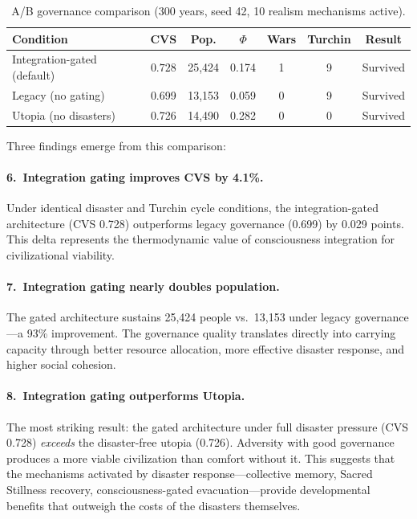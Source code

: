 \documentclass[12pt,a4paper]{article}
\begin{document}
\begin{table}[h]
\centering
\caption{A/B governance comparison (300 years, seed 42, 10 realism mechanisms active).}
\label{tab:ab}
\begin{tabular}{@{}lcccccc@{}}
\toprule
\textbf{Condition} & \textbf{CVS} & \textbf{Pop.} & \textbf{$\Phi$} & \textbf{Wars} & \textbf{Turchin} & \textbf{Result} \\
\midrule
Integration-gated (default) & $\mathbf{0.728}$ & 25,424 & 0.174 & 1 & 9 & Survived \\
Legacy (no gating)          & 0.699           & 13,153 & 0.059 & 0 & 9 & Survived \\
Utopia (no disasters)       & 0.726           & 14,490 & 0.282 & 0 & 0 & Survived \\
\bottomrule
\end{tabular}
\end{table}

Three findings emerge from this comparison:

\paragraph{6.\ Integration gating improves CVS by 4.1\%.} Under identical disaster and Turchin cycle conditions, the integration-gated architecture (CVS 0.728) outperforms legacy governance (0.699) by 0.029 points. This delta represents the thermodynamic value of consciousness integration for civilizational viability.

\paragraph{7.\ Integration gating nearly doubles population.} The gated architecture sustains 25,424 people vs.\ 13,153 under legacy governance---a 93\% improvement. The governance quality translates directly into carrying capacity through better resource allocation, more effective disaster response, and higher social cohesion.

\paragraph{8.\ Integration gating outperforms Utopia.} The most striking result: the gated architecture under full disaster pressure (CVS 0.728) \emph{exceeds} the disaster-free utopia (0.726). Adversity with good governance produces a more viable civilization than comfort without it. This suggests that the mechanisms activated by disaster response---collective memory, Sacred Stillness recovery, consciousness-gated evacuation---provide developmental benefits that outweigh the costs of the disasters themselves.
\end{document}

